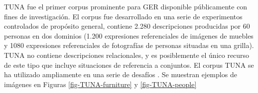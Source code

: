 
TUNA \cite{tuna-corpus} fue el primer corpus prominente para GER disponible p\'ublicamente con fines de investigaci\'on. El corpus fue desarrollado en una serie de experimentos controlados de prop\'osito general, contiene 2.280 descripciones producidas por 60 personas en dos dominios (1.200 expresiones referenciales de im\'agenes de muebles y 1080 expresiones referenciales de fotograf\'ias de personas situadas en una grilla). TUNA no contiene descripciones relacionales, y es posiblemente el \'unico recurso de este tipo que incluye situaciones de referencia a conjuntos. El corpus TUNA se ha utilizado ampliamente en una serie de desaf\'ios \cite{reg2009}. Se muestran ejemplos de im\'agenes en Figuras \ref{fig-TUNA-furniture} y \ref{fig-TUNA-people}

